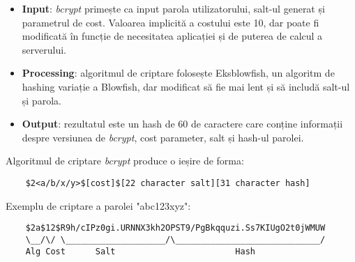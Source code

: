 \begin{itemize}
    \item \textbf{Input}: \textit{bcrypt} primește ca input parola utilizatorului, salt-ul generat
    și parametrul de cost. Valoarea implicită a costului este 10, dar poate fi modificată în funcție
    de necesitatea aplicației și de puterea de calcul a serverului.
    \item \textbf{Processing}: algoritmul de criptare folosește Eksblowfish, un algoritm de hashing
    variație a Blowfish, dar modificat să fie mai lent și să includă salt-ul și parola.
    \item \textbf{Output}: rezultatul este un hash de 60 de caractere care conține informații despre
    versiunea de \textit{bcrypt}, cost parameter, salt și hash-ul parolei.
\end{itemize}

\par
Algoritmul de criptare \textit{bcrypt} produce o ieșire de forma:
\begin{verbatim}
    $2<a/b/x/y>$[cost]$[22 character salt][31 character hash]
\end{verbatim}

Exemplu de criptare a parolei "abc123xyz"\footnotemark[1]:
\begin{verbatim}
    $2a$12$R9h/cIPz0gi.URNNX3kh2OPST9/PgBkqquzi.Ss7KIUgO2t0jWMUW
    \__/\/ \____________________/\_____________________________/
    Alg Cost      Salt                        Hash
\end{verbatim}


